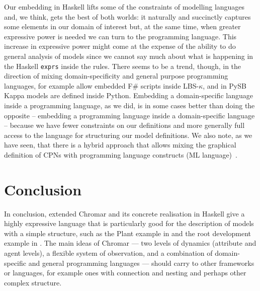 Our embedding in Haskell lifts some of the constraints of modelling languages
and, we think, gets the best of both worlds: it naturally and succinctly
captures some elements in our domain of interest but, at the same time, when
greater expressive power is needed we can turn to the programming language. This
increase in expressive power might come at the expense of the ability to do
general analysis of models since we cannot say much about what is happening in
the Haskell \texttt{exprs} inside the rules. There seems to be a trend, though,
in the direction of mixing domain-specificity and general purpose programming
languages, for example \citet{pedersen_high-level_2015} allow embedded F\#
scripts inside LBS-$\kappa$, and in PySB \citep{lopez_programming_2013} Kappa
models are defined inside Python. Embedding a domain-specific language inside a
programming language, as we did, is in some cases better than doing the opposite
-- embedding a programming language inside a domain-specific language -- because
we have fewer constraints on our definitions and more generally full access to
the language for structuring our model definitions. We also note, as we have
seen, that there is a hybrid approach that allows mixing the graphical
definition of CPNs with programming language constructs (ML
language)~\citep{jensen_coloured_1987}.

\section{Conclusion}
In conclusion, extended Chromar and its concrete realisation in Haskell give a
highly expressive language that is particularly good for the description of
models with a simple structure, such as the Plant example in
 and the root development example in
. The main ideas of Chromar --- two levels of dynamics
(attribute and agent levels), a flexible system of observation, and a
combination of domain-specific and general programming languages --- should
carry to other frameworks or languages, for example ones with connection and
nesting and perhaps other complex structure.

